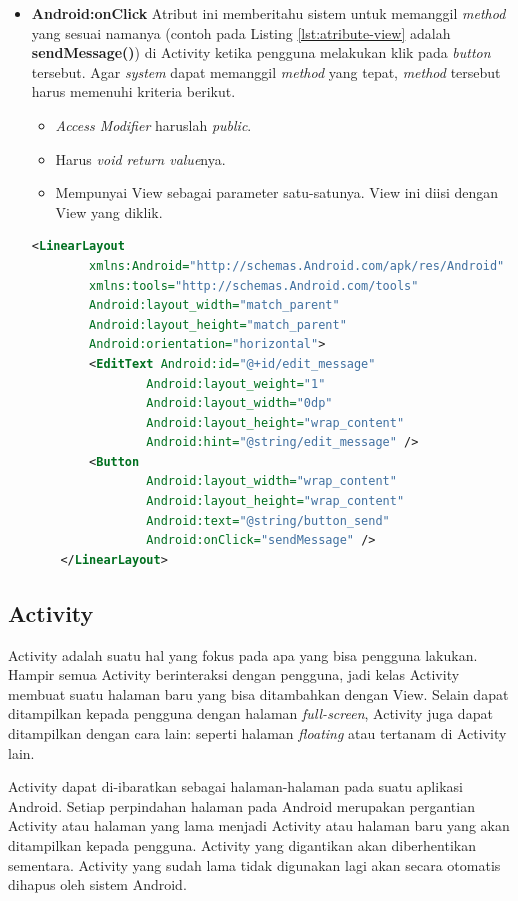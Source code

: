 \begin{itemize}
\begin{lstlisting}[caption={Contoh kode pada string.xml},label={lst:string-xml},language=xml]
\end{lstlisting}


	\item \textbf{Android:onClick}
	Atribut ini memberitahu sistem untuk memanggil \textit{method} yang sesuai namanya (contoh pada Listing \ref{lst:atribute-view} adalah \textbf{sendMessage()}) di Activity ketika pengguna melakukan klik pada \textit{button} tersebut. Agar \textit{system} dapat memanggil \textit{method} yang tepat, \textit{method} tersebut harus memenuhi kriteria berikut.
	\begin{itemize}
		\item \textit{Access Modifier} haruslah \textit{public}.
		\item Harus \textit{void return value}nya.
		\item Mempunyai View sebagai parameter satu-satunya. View ini diisi dengan View yang diklik.
	\end{itemize}
\begin{lstlisting}[caption={Contoh kode file XML pada folder layout},label={lst:atribute-view},language=xml]
	<LinearLayout
		xmlns:Android="http://schemas.Android.com/apk/res/Android"
		xmlns:tools="http://schemas.Android.com/tools"
		Android:layout_width="match_parent"
		Android:layout_height="match_parent"
		Android:orientation="horizontal">
		<EditText Android:id="@+id/edit_message"
				Android:layout_weight="1"
				Android:layout_width="0dp"
				Android:layout_height="wrap_content"
				Android:hint="@string/edit_message" />
		<Button
				Android:layout_width="wrap_content"
				Android:layout_height="wrap_content"
				Android:text="@string/button_send"
				Android:onClick="sendMessage" />
	</LinearLayout>
\end{lstlisting}
\end{itemize}


\subsection{Activity}
\label{sec:activity}
Activity adalah suatu hal yang fokus pada apa yang bisa pengguna lakukan. Hampir semua Activity berinteraksi dengan pengguna, jadi kelas Activity membuat suatu halaman baru yang bisa ditambahkan dengan View. Selain dapat ditampilkan kepada pengguna dengan halaman \textit{full-screen}, Activity juga dapat ditampilkan dengan cara lain: seperti halaman \textit{floating} atau tertanam di Activity lain.

Activity dapat di-ibaratkan sebagai halaman-halaman pada suatu aplikasi Android. Setiap perpindahan halaman pada Android merupakan pergantian Activity atau halaman yang lama menjadi Activity atau halaman baru yang akan ditampilkan kepada pengguna. Activity yang digantikan akan diberhentikan sementara. Activity yang sudah lama tidak digunakan lagi akan secara otomatis dihapus oleh sistem Android.  

